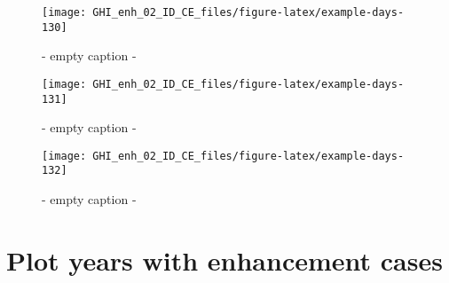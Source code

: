 \documentclass[
  10pt,
  a4paper,oneside]{article}
\begin{document}
\begin{figure}[H]

{\centering \texttt{[image: GHI\_enh\_02\_ID\_CE\_files/figure-latex/example-days-130]} 

}

\caption{ - empty caption - }\label{fig:example-days-130}
\end{figure}

\begin{figure}[H]

{\centering \texttt{[image: GHI\_enh\_02\_ID\_CE\_files/figure-latex/example-days-131]} 

}

\caption{ - empty caption - }\label{fig:example-days-131}
\end{figure}

\begin{figure}[H]

{\centering \texttt{[image: GHI\_enh\_02\_ID\_CE\_files/figure-latex/example-days-132]} 

}

\caption{ - empty caption - }\label{fig:example-days-132}
\end{figure}

\newpage
\FloatBarrier

\hypertarget{plot-years-with-enhancement-cases}{%
\section{Plot years with enhancement cases}\label{plot-years-with-enhancement-cases}}
\end{document}
